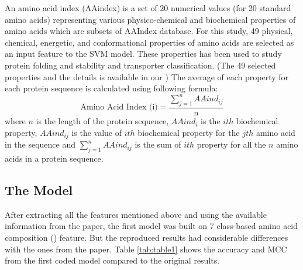     
    An amino acid index (AAindex) is a set of 20 numerical values (for 20 standard amino acids) representing various physico-chemical 
    and biochemical properties of amino acids which are subsets of AAIndex database. \cite{aaindex} For this study, 49 physical, 
    chemical, energetic, and conformational properties of amino acids are selected as an input feature to the SVM model. These properties 
    has been used to study protein folding and stability and transporter classification.
    \cite{zavaljevski2002support, gromiha1999importance, gromiha2006statistical} (The 49 selected properties and the details is 
    available in our ) The average of each property for each protein sequence is calculated using following formula:
    \begin{equation}
        \text{Amino Acid Index (i)} = \frac {\sum_{j=1}^{n} AAind_{ij}} {\text{n}}
    \end{equation}
    where $n$ is the length of the protein sequence, $AAind_{i}$ is the $ith$ biochemical property, $AAind_{ij}$ is the value of $ith$ 
    biochemical property for the $jth$ amino acid in the sequence and $\sum_{j=1}^{n} AAind_{ij}$ is the sum of $ith$ property for all the
    $n$ amino acids in a protein sequence.


    
  

    
    \subsection{The Model}
    After extracting all the features mentioned above and using the available information from the paper, 
    the first model was built on 7 class-based amino acid composition () feature. But the  reproduced 
    results had considerable differences with the ones from the paper.  
    Table \ref{tab:table1} shows the accuracy and MCC from  the first coded model compared to the original results.\\

